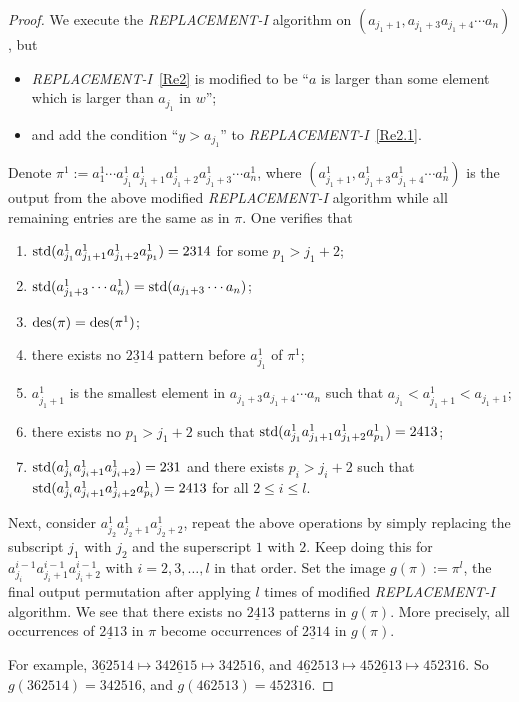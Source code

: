 \begin{proof}
  We execute the \textit{REPLACEMENT-I} algorithm on $(a_{j_1+1},a_{j_1+3}a_{j_1+4}\cdots a_n)$, but
  \begin{itemize}
      \item \textit{REPLACEMENT-I}~\ref{Re2} is modified to be ``$a$ is larger than some element which is larger than $a_{j_1}$ in $w$'';
      \item  and add the condition ``$y>a_{j_1}$'' to \textit{REPLACEMENT-I}~\ref{Re2.1}. 
  \end{itemize}
  Denote $\pi^1:=a_1^1\cdots a_{j_1}^1a_{j_1+1}^1a_{j_1+2}^1a_{j_1+3}^1 \cdots a_n^1$, where $(a_{j_1+1}^1,a_{j_1+3}^1a_{j_1+4}^1\cdots a_n^1)$ is the output from the above modified \textit{REPLACEMENT-I} algorithm while all remaining entries are the same as in $\pi$. One verifies that 
  \begin{enumerate}[label=(\roman*)]
      \item $\mathrm{std}(a_{j_1}^1a_{j_1+1}^1a_{j_1+2}^1a_{p_1}^1)=2314$ for some $p_1>j_1+2$;
      \item $\mathrm{std}(a_{j_1+3}^1 \cdots a_n^1)=\mathrm{std}(a_{j_1+3} \cdots a_n)$;
      \item $\mathrm{des}(\pi)=\mathrm{des}(\pi^1)$;
      \item there exists no $\underline{231}4$ pattern before $a_{j_1}^1$ of $\pi^1$;
      \item $a_{j_1+1}^1$ is the smallest element in $a_{j_1+3}a_{j_1+4}\cdots a_n$ such that $a_{j_1}<a_{j_1+1}^1<a_{j_1+1}$;
      \item there exists no $p_1>j_1+2$ such that $\mathrm{std}(a_{j_1}^1a_{j_1+1}^1a_{j_1+2}^1a_{p_1}^1)=2413$;
      \item $\mathrm{std}(a_{j_i}^1a_{j_i+1}^1a_{j_i+2}^1)=231$ and there exists $p_i>j_i+2$ such that $\mathrm{std}(a_{j_i}^1a_{j_i+1}^1a_{j_i+2}^1a_{p_i}^1)=2413$ for all $2\le i\le l$.
  \end{enumerate}
  Next, consider $a_{j_2}^1 a_{j_2+1}^1 a_{j_2+2}^1$, repeat the above operations by simply replacing the subscript $j_1$ with $j_2$ and the 
  superscript $1$ with $2$. Keep doing this for $a_{j_i}^{i-1} a_{j_i+1}^{i-1} a_{j_i+2}^{i-1}$ with $i=2,3,\ldots, l$ in that order. Set the image $g(\pi):=\pi^l$, the final output permutation after applying $l$ times of modified \textit{REPLACEMENT-I} algorithm. We see that there exists no $\underline{241}3$ patterns in $g(\pi)$. More precisely, all occurrences of $\underline{241}3$ in $\pi$ become occurrences of $\underline{231}4$ in $g(\pi)$.

  For example, $\underline{362}514 \mapsto 34\underline{261}5 \mapsto 342516$, and
  $\underline{462}513 \mapsto 45\underline{261}3 \mapsto 452316$. So $g(362514)=342516$, and $g(462513)=452316$.


\end{proof}
